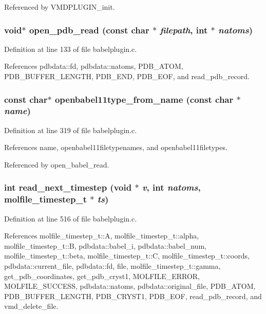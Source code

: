 Referenced by VMDPLUGIN\_\-init.
\subsubsection{\setlength{\rightskip}{0pt plus 5cm}void$\ast$ open\_\-pdb\_\-read (const char $\ast$ {\em filepath}, int $\ast$ {\em natoms})\hspace{0.3cm}{\tt  [static]}}\label{babelplugin_8c_a11}




Definition at line 133 of file babelplugin.c.

References pdbdata::fd, pdbdata::natoms, PDB\_\-ATOM, PDB\_\-BUFFER\_\-LENGTH, PDB\_\-END, PDB\_\-EOF, and read\_\-pdb\_\-record.
\subsubsection{\setlength{\rightskip}{0pt plus 5cm}const char$\ast$ openbabel11type\_\-from\_\-name (const char $\ast$ {\em name})\hspace{0.3cm}{\tt  [static]}}\label{babelplugin_8c_a13}




Definition at line 319 of file babelplugin.c.

References name, openbabel11filetypenames, and openbabel11filetypes.

Referenced by open\_\-babel\_\-read.
\subsubsection{\setlength{\rightskip}{0pt plus 5cm}int read\_\-next\_\-timestep (void $\ast$ {\em v}, int {\em natoms}, {\bf molfile\_\-timestep\_\-t} $\ast$ {\em ts})\hspace{0.3cm}{\tt  [static]}}\label{babelplugin_8c_a16}




Definition at line 516 of file babelplugin.c.

References molfile\_\-timestep\_\-t::A, molfile\_\-timestep\_\-t::alpha, molfile\_\-timestep\_\-t::B, pdbdata::babel\_\-i, pdbdata::babel\_\-num, molfile\_\-timestep\_\-t::beta, molfile\_\-timestep\_\-t::C, molfile\_\-timestep\_\-t::coords, pdbdata::current\_\-file, pdbdata::fd, file, molfile\_\-timestep\_\-t::gamma, get\_\-pdb\_\-coordinates, get\_\-pdb\_\-cryst1, MOLFILE\_\-ERROR, MOLFILE\_\-SUCCESS, pdbdata::natoms, pdbdata::original\_\-file, PDB\_\-ATOM, PDB\_\-BUFFER\_\-LENGTH, PDB\_\-CRYST1, PDB\_\-EOF, read\_\-pdb\_\-record, and vmd\_\-delete\_\-file.

